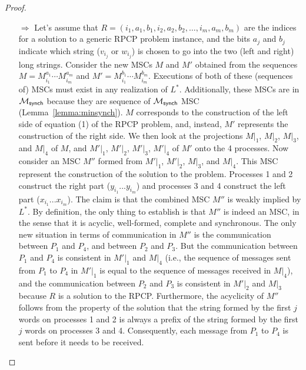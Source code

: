 \begin{proof}
	\begin{itemize}
		\item[$\Rightarrow$]
		      Let's assume that
		      $R = (i_1, a_1, b_1, i_2, a_2, b_2, \ldots, i_m, a_m, b_m)$ are the indices
		      for a solution to a generic RPCP problem instance, and the bits $a_j$ and
		      $b_j$ indicate which string ($v_{i_j}$ or $w_{i_j}$) is chosen to go into
		      the two (left and right)
		      long strings. Consider the new MSCs $M$ and $M'$ obtained from the sequences
		      $M = M^{a_1}_{i_1} \cdots M^{a_m}_{i_m}$ and $M' = M^{b_1}_{i_1} \cdots M^{b_m}_{i_m}$.
		      Executions of both of these (sequences of) MSCs must exist in any
		      realization of $L^*$. Additionally, these MSCs are in $\mathcal{M}_{\mathsf{synch}}$
		      because they are sequence of $\mathcal{M}_{\mathsf{synch}}$ MSC (Lemma~\ref{lemma:minsynch}).
		      $M$ corresponds to the construction of the left side of equation (1) of the RPCP
		      problem, and, instead, $M'$ represents the construction of the right side.
		      We then look at the projections $M|_1$, $M|_2$, $M|_3$,
		      and $M|_4$ of $M$, and $M'|_1$, $M'|_2$, $M'|_3$, $M'|_4$ of $M'$ onto the
		      4 processes. Now consider an MSC $M''$ formed from $M'|_1$, $M'|_2$,
		      $M|_3$, and $M|_4$. This MSC represent the construction of the solution to
		      the problem. Processes 1 and 2 construct the right part ($y_{i_1}...y_{i_m}$)
		      and processes 3 and 4 construct the left part ($x_{i_1}...x_{i_m}$).
		      The claim is that the combined MSC $M''$ is weakly
		      implied by $L^*$. By definition, the only thing to establish is that $M''$
		      is indeed an MSC, in the sense that it is acyclic, well-formed, complete
		      and synchronous.
		      The only new situation in terms of communication in $M''$ is the
		      communication between $P_1$ and $P_4$, and between $P_2$ and $P_3$.
		      But the communication between $P_1$ and $P_4$ is consistent in
		      $M'|_1$ and $M|_4$ (i.e., the sequence of messages sent from $P_1$ to
		      $P_4$ in $M'|_1$ is equal to the sequence of messages received in $M|_4$),
		      and the communication between $P_2$ and $P_3$ is consistent in
		      $M'|_2$ and $M|_3$ because $R$ is a solution to the RPCP.
		      Furthermore, the acyclicity of $M''$ follows from the property of the
		      solution that the string formed by the first $j$ words on processes 1
		      and 2 is always a prefix of the string formed by the first $j$ words
		      on processes 3 and 4. Consequently, each message from $P_1$ to $P_4$
		      is sent before it needs to be received.


\end{itemize}
\end{proof}
